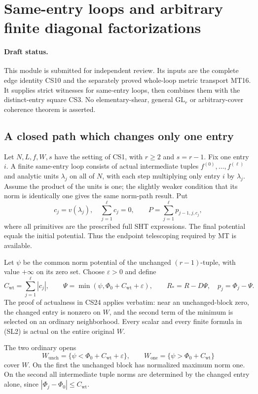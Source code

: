 \section{Same-entry loops and arbitrary finite diagonal factorizations}
\label{sec:r10-diagonal-path-coherence}

\paragraph{Draft status.}
This module is submitted for independent review.  Its inputs are the
complete edge identity CS10 and the separately proved whole-loop
metric transport MT16.  It supplies strict witnesses for same-entry
loops, then combines them with the distinct-entry square CS3.
No elementary-shear, general $\mathrm{GL}_r$ or arbitrary-cover
coherence theorem is asserted.

\subsection{A closed path which changes only one entry}

Let $N,L,f,W,s$ have the setting of CS1, with $r\ge2$ and
$s=r-1$.  Fix one entry $i$.  A finite same-entry loop consists
of actual intermediate tuples $f^{(0)},\ldots,f^{(\ell)}$ and
analytic units $\lambda_j$ on all of $N$, with each step multiplying
only entry $i$ by $\lambda_j$.  Assume the product of the units is
one; the slightly weaker condition that its norm is identically
one gives the same norm-path result.  Put
\[
 c_j=v(\lambda_j),\quad \sum_{j=1}^{\ell}c_j=0,\qquad
 P=\sum_{j=1}^{\ell}p_{j-1,j,c_j},
 \tag{SL1}
\]
where all primitives are the prescribed full SHT expressions.
The final potential equals the initial potential.  Thus the
endpoint telescoping required by MT is available.

Let $\psi$ be the common norm potential of the unchanged
$(r-1)$-tuple, with value $+\infty$ on its zero set.  Choose
$\varepsilon>0$ and define
\[
 C_{\mathrm{wt}}=\sum_{j=1}^{\ell}|c_j|,\qquad
 \Psi=\min(\psi,\Phi_0+C_{\mathrm{wt}}+\varepsilon),\qquad
 R_*=R-D\Psi,\quad p_j=\Phi_j-\Psi .
 \tag{SL2}
\]
The proof of actualness in CS24 applies verbatim: near an
unchanged-block zero, the changed entry is nonzero on $W$, and
the second term of the minimum is selected on an ordinary
neighborhood.  Every scalar and every finite formula in (SL2)
is actual on the entire original $W$.

The two ordinary opens
\[
 W_{\mathrm{unch}}=\{\psi<\Phi_0+C_{\mathrm{wt}}+\varepsilon\},
 \qquad
 W_{\mathrm{one}}=\{\psi>\Phi_0+C_{\mathrm{wt}}\}
 \tag{SL3}
\]
cover $W$.  On the first the unchanged block has normalized
maximum norm one.  On the second all intermediate tuple norms
are determined by the changed entry alone, since
$|\Phi_j-\Phi_0|\le C_{\mathrm{wt}}$.

